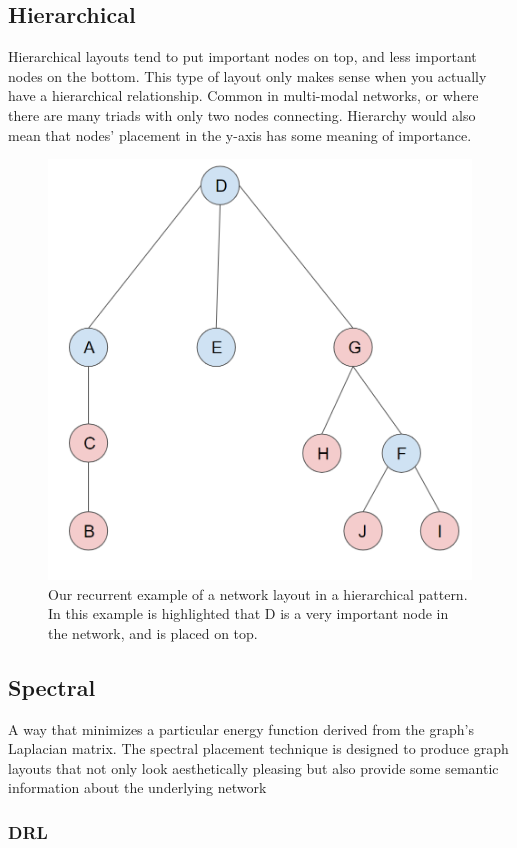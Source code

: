 \subsection{Hierarchical}

Hierarchical layouts tend to put important nodes on top, and less important nodes on the bottom. This type of layout only makes sense when you actually have a hierarchical relationship. Common in multi-modal networks, or where there are many triads with only two nodes connecting. Hierarchy would also mean that nodes' placement in the y-axis has some meaning of importance.

    \begin{figure}[h]
        \centering
            \includegraphics[width=0.5\linewidth]{figures/Networks/Layouts/hirearchy.png} 
        \caption{Our recurrent example of a network layout in a hierarchical pattern. In this example is highlighted that D is a very important node in the network, and is placed on top.}
        \label{figure:networkExampleHierarchy}
    \end{figure}

\subsection{Spectral}

A way that minimizes a particular energy function derived from the graph's Laplacian matrix. The spectral placement technique is designed to produce graph layouts that not only look aesthetically pleasing but also provide some semantic information about the underlying network

\subsubsection{DRL}

